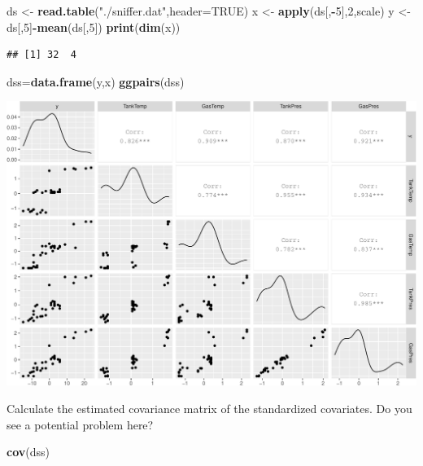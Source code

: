 \documentclass[
  ignorenonframetext,
]{beamer}
\newenvironment{Shaded}{\begin{snugshade}}{\end{snugshade}}
\newcommand{\DataTypeTok}[1]{\textcolor[rgb]{0.13,0.29,0.53}{#1}}
\newcommand{\DecValTok}[1]{\textcolor[rgb]{0.00,0.00,0.81}{#1}}
\newcommand{\KeywordTok}[1]{\textcolor[rgb]{0.13,0.29,0.53}{\textbf{#1}}}
\newcommand{\NormalTok}[1]{#1}
\newcommand{\OperatorTok}[1]{\textcolor[rgb]{0.81,0.36,0.00}{\textbf{#1}}}
\newcommand{\OtherTok}[1]{\textcolor[rgb]{0.56,0.35,0.01}{#1}}
\newcommand{\StringTok}[1]{\textcolor[rgb]{0.31,0.60,0.02}{#1}}
\begin{document}
\begin{frame}[fragile]

\begin{Shaded}
\begin{Highlighting}[]
\NormalTok{ds <-}\StringTok{ }\KeywordTok{read.table}\NormalTok{(}\StringTok{"./sniffer.dat"}\NormalTok{,}\DataTypeTok{header=}\OtherTok{TRUE}\NormalTok{)}
\NormalTok{x <-}\StringTok{ }\KeywordTok{apply}\NormalTok{(ds[,}\OperatorTok{-}\DecValTok{5}\NormalTok{],}\DecValTok{2}\NormalTok{,scale)}
\NormalTok{y <-}\StringTok{ }\NormalTok{ds[,}\DecValTok{5}\NormalTok{]}\OperatorTok{-}\KeywordTok{mean}\NormalTok{(ds[,}\DecValTok{5}\NormalTok{])}
\KeywordTok{print}\NormalTok{(}\KeywordTok{dim}\NormalTok{(x))}
\end{Highlighting}
\end{Shaded}

\begin{verbatim}
## [1] 32  4
\end{verbatim}

\begin{Shaded}
\begin{Highlighting}[]
\NormalTok{dss=}\KeywordTok{data.frame}\NormalTok{(y,x)}
\KeywordTok{ggpairs}\NormalTok{(dss)}
\end{Highlighting}
\end{Shaded}

\includegraphics{L2_files/figure-beamer/unnamed-chunk-3-1.pdf}

Calculate the estimated covariance matrix of the standardized
covariates. Do you see a potential problem here?

\begin{Shaded}
\begin{Highlighting}[]
\KeywordTok{cov}\NormalTok{(dss)}
\end{Highlighting}
\end{Shaded}


\end{frame}
\end{document}
